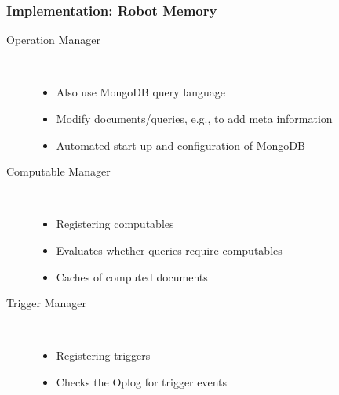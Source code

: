 \begin{frame}
  \frametitle{Implementation: Robot Memory}
  \begin{description}
  \item[Operation Manager]%
                \hfill \\
    \begin{itemize}
    \item Also use MongoDB query language
    \item Modify documents/queries, e.g., to add meta information %
    \item Automated start-up and configuration of MongoDB %
    \end{itemize}
  \item[Computable Manager]%
                \hfill \\
    \begin{itemize}
    \item Registering computables
    \item Evaluates whether queries require computables
    \item Caches of computed documents
    \end{itemize}
  \item[Trigger Manager]%
                \hfill \\
    \begin{itemize}
    \item Registering triggers
    \item Checks the Oplog for trigger events
    \end{itemize}
  \end{description}
\end{frame}


